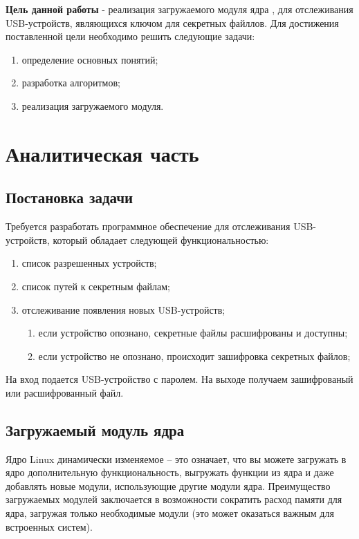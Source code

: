 \documentclass[a4paper, 10pt]{article}
\begin{document}
\hspace*{5mm}\textbf{Цель данной работы} - реализация загружаемого модуля ядра , для отслеживания USB-устройств, являющихся ключом для секретных файллов.
Для достижения поставленной цели необходимо решить следующие задачи:
\begin{enumerate}
 	\item определение основных понятий;
 	\item разработка алгоритмов;
 	\item реализация загружаемого модуля.
\end{enumerate}
	
\clearpage
\newpage
\section{Аналитическая часть}
	\subsection{Постановка задачи}
	\hspace*{5mm} Требуется разработать программное обеспечение для отслеживания USB-устройств, который обладает следующей функциональностью:
	\begin{enumerate}
		\item список разрешенных устройств;
		\item список путей к секретным файлам;
		\item отслеживание появления новых USB-устройств;
		\begin{enumerate}
			\item если устройство опознано, секретные файлы расшифрованы и доступны;
			\item если устройство не опознано, происходит зашифровка секретных файлов;
		\end{enumerate}
	\end{enumerate}
	\hspace*{5mm} На вход подается USB-устройство с паролем. На выходе получаем зашифрованый или расшифрованный файл.
	
	\subsection{Загружаемый модуль ядра}
	\hspace*{5mm} Ядро Linux динамически изменяемое -- это означает, что вы можете загружать в ядро дополнительную функциональность, выгружать функции из ядра и даже добавлять новые модули, использующие другие модули ядра. Преимущество загружаемых модулей заключается в возможности сократить расход памяти для ядра, загружая только необходимые модули (это может оказаться важным для встроенных систем).
	
\end{document}
